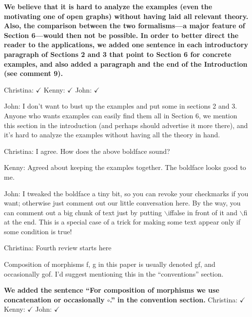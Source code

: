 \documentclass[reqno]{amsart}
\def\chris{\color{purple} Christina: }
\def\john{\color{red} John: }
\def\kenny{\color{blue} Kenny: }
\begin{document}
\begin{enumerate}
{{\bf We believe that it is hard to analyze the examples (even the motivating one of open graphs) without having laid all relevant theory. Also, 
the comparison between the two formalisms---a major feature of Section 6---would then not be possible. In order to 
better direct the reader to the applications, we added one sentence in each introductory paragraph of Sections 2 and 3 that point to Section 6 for 
concrete examples, and also added a paragraph and the end of the Introduction (see comment 9). } 

{\chris $\checkmark$} {\kenny $\checkmark$} {\john $\checkmark$}

{\john
I don't want to bust up the examples and put some in sections 2 and 3. Anyone who wants examples can easily find them all in Section 6, we mention 
this section in the introduction (and perhaps should advertise it more there), and it's hard to analyze the examples without having all the theory in 
hand.}

{\chris I agree. How does the above boldface sound?}

{\kenny Agreed about keeping the examples together. The boldface looks good to me.}

{\john I tweaked the boldface a tiny bit, so you can revoke your checkmarks if you want; 
otherwise just comment out our little conversation here. By the way, you can comment out
a big chunk of text just by putting $\backslash$iffalse in front of it and $\backslash$fi at the end.  This is a special case of a trick for making some text appear only if some condition is true!}

{\chris Fourth review starts here}
\item Composition of morphisms f, g in this paper is usually denoted gf, and occasionally gof. I’d suggest mentioning this in the “conventions” 
section.

{\bf We added the sentence ``For composition of morphisms we use concatenation or occasionally $\circ$.'' in the convention section.} {\chris $\checkmark$} {\kenny $\checkmark$} {\john $\checkmark$}



}
\end{enumerate}
\end{document}
